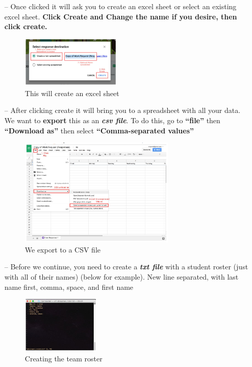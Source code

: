 \documentclass[10pt]{article}
\begin{document}
\begin{enumerate}
\newpage
\item[--] Once clicked it will ask you to create an excel sheet or select an existing excel sheet. \textbf{Click Create and Change the name if you desire, then click create.}
\begin{figure}[h]
\caption{This will create an excel sheet}
\centering
\includegraphics[width=0.45\textwidth]{pic6}
\end{figure}
\item[--] After clicking create it will bring you to a spreadsheet with all your data. We want to \textbf{export} this as an \textbf{\textit{csv file}}. To do this, go to \textbf{“file”} then \textbf{“Download as”} then select \textbf{“Comma-separated values”}
\begin{figure}[h]
\caption{We export to a CSV file}
\centering
\includegraphics[width=0.7\textwidth]{pic7}
\end{figure}
\item[--] Before we continue, you need to create a \textbf{\textit{txt file}} with a student roster (just with all of their names) (below for example). New line separated, with last name first, comma, space, and first name
\begin{figure}[h]
\caption{Creating the team roster}
\centering
\includegraphics[width=0.35\textwidth]{pic8}

\end{figure}
\end{enumerate}
\end{document}
